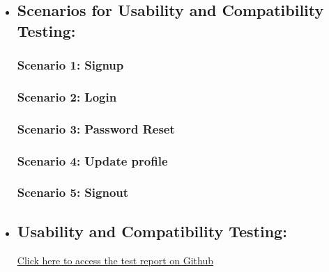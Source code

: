 \documentclass{article}
\begin{document}
\begin{itemize}
\href{https://tiedsnake.github.io/Uj_Senior_project2/Test_Results%20_ServiceTest.html}{Click here to access the test report on Github}


\newpage

\item \subsection{Scenarios for Usability and Compatibility Testing:}
\subsubsection{\label{sec:scenario9} Scenario 1: Signup}
\subsubsection{\label{sec:scenario10} Scenario 2: Login}
\subsubsection{\label{sec:scenario11} Scenario 3: Password Reset}
\subsubsection{\label{sec:scenario12} Scenario 4: Update profile}
\subsubsection{\label{sec:scenario13} Scenario 5: Signout}

\newpage

\item \subsection{Usability and Compatibility Testing:}
\href{https://tiedsnake.github.io/Uj_Senior_project2/Usability_Test.html}{Click here to access the test report on Github}
\end{itemize}
\end{document}
